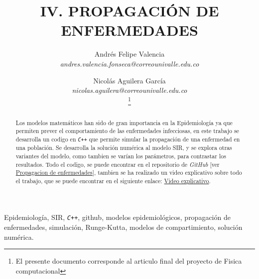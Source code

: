 \documentclass[journal]{IEEEtran}
\begin{document}
\title{IV. PROPAGACIÓN DE ENFERMEDADES}
\author{Andrés Felipe Valencia \\
	\textit{andres.valencia.fonseca@correounivalle.edu.co}\\%
	\and
	Nicolás Aguilera García \\
	\textit{nicolas.aguilera@correounivalle.edu.co}\\
	\thanks{El presente documento corresponde al articulo final del
		proyecto de Fisica computacional}} %

\maketitle

\begin{abstract}
	Los modelos matemáticos han sido de gran importancia en la Epidemiología ya que
	permiten prever el comportamiento de las enfermedades infecciosas, en este trabajo
	se desarrolla un codigo en \texttt{\textit{C++}} que permite simular la propagación
	de una enfermedad en una población. Se desarrolla la solución numérica al modelo SIR, y 
	se explora otras variantes del modelo, como tambien se varían los parámetros, para contrastar los resultados.
	Todo el codigo, se puede encontrar en el repositorio de \emph{GitHub}
	[ver \href{https://github.com/niaggar/propagacion-de-enfermedades-project}{Propagacion
	de enfermedades}], tambien se ha realizado un video explicativo sobre todo el trabajo,
	que se puede encontrar en el siguiente enlace: \href{https://drive.google.com/file/d/1-Wrr3fB-JRRgwQq_m59-RsKbWqgoxFI4/view?usp=share_link}{Video
	explicativo}.
\end{abstract}

\begin{IEEEkeywords}
Epidemiología, SIR, \texttt{\textit{C++}}, github, modelos epidemiológicos, propagación de enfermedades,
simulación, Runge-Kutta, modelos de compartimiento, solución numérica.
\end{IEEEkeywords}
\end{document}
